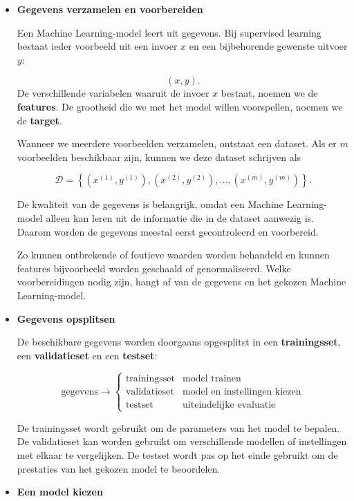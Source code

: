 \documentclass{ximera}
\begin{document}
\begin{itemize}
\item \textbf{Gegevens verzamelen en voorbereiden}

Een Machine Learning-model leert uit gegevens. Bij supervised learning bestaat ieder voorbeeld uit een invoer $x$ en een bijbehorende gewenste
uitvoer $y$:

\[
(x,y).
\]
De verschillende variabelen waaruit de invoer $x$ bestaat, noemen we de \textbf{features}. De grootheid die we met het model willen voorspellen, noemen we de \textbf{target}.


Wanneer we meerdere voorbeelden verzamelen, ontstaat een dataset. Als er $m$ voorbeelden beschikbaar zijn, kunnen we deze dataset
schrijven als

\[
\mathcal{D}
=
\left\{
(x^{(1)},y^{(1)}),
(x^{(2)},y^{(2)}),
\ldots,
(x^{(m)},y^{(m)})
\right\}.
\]

De kwaliteit van de gegevens is belangrijk, omdat een Machine Learning-model alleen kan leren uit de informatie die in de dataset aanwezig is. Daarom worden de gegevens meestal eerst gecontroleerd en voorbereid.

Zo kunnen ontbrekende of foutieve waarden worden behandeld en kunnen features bijvoorbeeld worden geschaald of genormaliseerd. Welke voorbereidingen nodig zijn, hangt af van de gegevens en het gekozen
Machine Learning-model.


\item \textbf{Gegevens opsplitsen}

De beschikbare gegevens worden doorgaans opgesplitst in een
\textbf{trainingsset}, een \textbf{validatieset} en een
\textbf{testset}:

\[
\boxed{
\text{gegevens}
\rightarrow
\begin{cases}
\text{trainingsset} & \text{model trainen}\\
\text{validatieset} & \text{model en instellingen kiezen}\\
\text{testset} & \text{uiteindelijke evaluatie}
\end{cases}
}
\]

De trainingsset wordt gebruikt om de parameters van het model te bepalen.
De validatieset kan worden gebruikt om verschillende modellen of
instellingen met elkaar te vergelijken. De testset wordt pas op het einde
gebruikt om de prestaties van het gekozen model te beoordelen.

\item \textbf{Een model kiezen}


\end{itemize}
\end{document}
